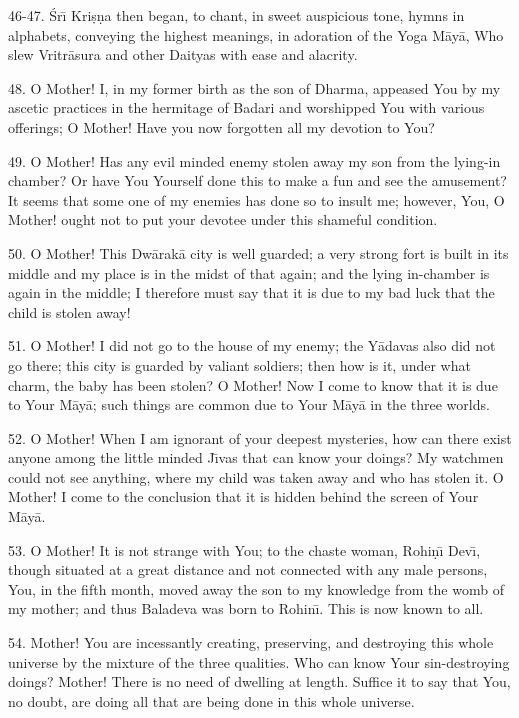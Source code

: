 46-47. \'Sr\={\i} Kri\d{s}\d{n}a then began, to chant, in sweet auspicious tone, hymns in alphabets, conveying the highest meanings, in adoration of the Yoga M\=ay\=a, Who slew Vritr\=asura and other Daityas with ease and alacrity.

48. O Mother! I, in my former birth as the son of Dharma, appeased You by my ascetic practices in the hermitage of Badari and worshipped You with various offerings; O Mother! Have you now forgotten all my devotion to You?

49. O Mother! Has any evil minded enemy stolen away my son from the lying-in chamber? Or have You Yourself done this to make a fun and see the amusement? It seems that some one of my enemies has done so to insult me; however, You, O Mother! ought not to put your devotee under this shameful condition.

50. O Mother! This Dw\=arak\=a city is well guarded; a very strong fort is built in its middle and my place is in the midst of that again; and the lying in-chamber is again in the middle; I therefore must say that it is due to my bad luck that the child is stolen away!

51. O Mother! I did not go to the house of my enemy; the Y\=adavas also did not go there; this city is guarded by valiant soldiers; then how is it, under what charm, the baby has been stolen? O Mother! Now I come to know that it is due to Your M\=ay\=a; such things are common due to Your M\=ay\=a in the three worlds.

52. O Mother! When I am ignorant of your deepest mysteries, how can there exist anyone among the little minded J\={\i}vas that can know your doings? My watchmen could not see anything, where my child was taken away and who has stolen it. O Mother! I come to the conclusion that it is hidden behind the screen of Your M\=ay\=a.

53. O Mother! It is not strange with You; to the chaste woman, Rohi\d{n}\={\i} Dev\={\i}, though situated at a great distance and not connected with any male persons, You, in the fifth month, moved away the son to my knowledge from the womb of my mother; and thus Baladeva was born to Rohin\={\i}. This is now known to all.

54. Mother! You are incessantly creating, preserving, and destroying this whole universe by the mixture of the three qualities. Who can know Your sin-destroying doings? Mother! There is no need of dwelling at length. Suffice it to say that You, no doubt, are doing all that are being done in this whole universe.

